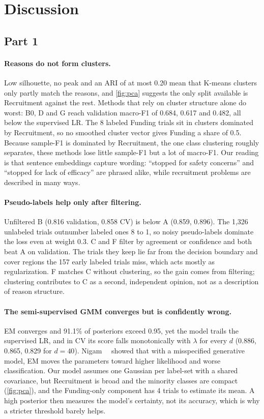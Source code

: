\section{Discussion}
\label{sec:discussion}

\subsection{Part 1}

\paragraph{Reasons do not form clusters.}
Low silhouette, no peak and an ARI of at most 0.20 mean that K-means clusters only partly match the reasons, and \cref{fig:pca} suggests the only split available is Recruitment against the rest.
Methods that rely on cluster structure alone do worst: B0, D and G reach validation macro-F1 of 0.684, 0.617 and 0.482, all below the supervised LR.
The 8 labeled Funding trials sit in clusters dominated by Recruitment, so no smoothed cluster vector gives Funding a share of 0.5.
Because sample-F1 is dominated by Recruitment, the one class clustering roughly separates, these methods lose little sample-F1 but a lot of macro-F1.
Our reading is that sentence embeddings capture wording: ``stopped for safety concerns'' and ``stopped for lack of efficacy'' are phrased alike, while recruitment problems are described in many ways.

\paragraph{Pseudo-labels help only after filtering.}
Unfiltered B (0.816 validation, 0.858 CV) is below A (0.859, 0.896).
The 1,326 unlabeled trials outnumber labeled ones 8 to 1, so noisy pseudo-labels dominate the loss even at weight 0.3.
C and F filter by agreement or confidence and both beat A on validation.
The trials they keep lie far from the decision boundary and cover regions the 157 early labeled trials miss, which acts mostly as regularization.
F matches C without clustering, so the gain comes from filtering; clustering contributes to C as a second, independent opinion, not as a description of reason structure.

\paragraph{The semi-supervised GMM converges but is confidently wrong.}
EM converges and 91.1\% of posteriors exceed 0.95, yet the model trails the supervised LR, and in CV its score falls monotonically with $\lambda$ for every $d$ (0.886, 0.865, 0.829 for $d=40$).
Nigam~\etal~\cite{nigam2000text} showed that with a misspecified generative model, EM moves the parameters toward higher likelihood and worse classification.
Our model assumes one Gaussian per label-set with a shared covariance, but Recruitment is broad and the minority classes are compact (\cref{fig:pca}), and the Funding-only component has 4 trials to estimate its mean.
A high posterior then measures the model's certainty, not its accuracy, which is why a stricter threshold barely helps.

